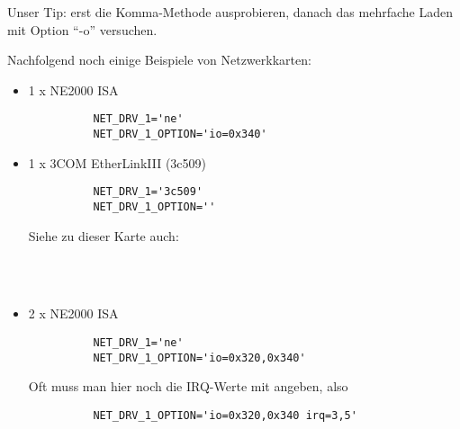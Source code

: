 \begin{description}
{    Unser Tip: erst die Komma-Methode ausprobieren, danach das mehrfache Laden mit Option
    ``-o'' versuchen.

    Nachfolgend noch einige Beispiele von Netzwerkkarten:

    \begin{itemize}
    \item 1 x NE2000 ISA
      \begin{example}
      \begin{verbatim}
          NET_DRV_1='ne'
          NET_DRV_1_OPTION='io=0x340'
      \end{verbatim}
      \end{example}

    \item  1 x 3COM EtherLinkIII (3c509)
      \begin{example}
      \begin{verbatim}
          NET_DRV_1='3c509'
          NET_DRV_1_OPTION=''
      \end{verbatim}
      \end{example}
      Siehe zu dieser Karte auch:

    \begin{raggedright}
      \\
      \\
      \par
    \end{raggedright}

    \item 2 x NE2000 ISA
      \begin{example}
      \begin{verbatim}
          NET_DRV_1='ne'
          NET_DRV_1_OPTION='io=0x320,0x340'
      \end{verbatim}
      \end{example}
      Oft muss man hier noch die IRQ-Werte mit angeben, also

      \begin{example}
      \begin{verbatim}
          NET_DRV_1_OPTION='io=0x320,0x340 irq=3,5'
      \end{verbatim}
      \end{example}


\end{itemize}}
\end{description}
